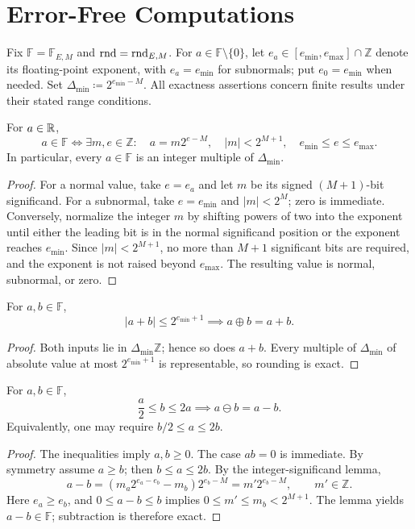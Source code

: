 \section{Error-Free Computations}

Fix $\mathbb F=\mathbb F_{E, M}$ and $\operatorname{rnd}=\operatorname{rnd}_{E, M}$.
For $a\in\mathbb F\setminus\{0\}$, let
$e_a\in[e_{\min}, e_{\max}]\cap\mathbb Z$ denote its
floating-point exponent, with $e_a=e_{\min}$ for subnormals;
put $e_0=e_{\min}$ when needed. Set
$\Delta_{\min}\coloneqq2^{e_{\min}-M}$.
All exactness assertions concern finite results under their
stated range conditions.

\begin{lemma}
For $a\in\mathbb{R}$,
\[
 a\in\mathbb F\iff
 \exists m, e\in\mathbb Z:\quad
 a=m2^{e-M}, \quad |m|<2^{M+1}, \quad
 e_{\min}\le e\le e_{\max}.
\]
In particular, every $a\in\mathbb F$ is an integer multiple
of $\Delta_{\min}$.
\end{lemma}
\begin{proof}
For a normal value, take $e=e_a$ and let $m$ be its signed
$(M+1)$-bit significand. For a subnormal, take $e=e_{\min}$
and $|m|<2^M$; zero is immediate.
Conversely, normalize the integer $m$ by shifting powers of
two into the exponent until either the leading bit is in the
normal significand position or the exponent reaches $e_{\min}$.
Since $|m|<2^{M+1}$, no more than $M+1$ significant bits
are required, and the exponent is not raised beyond
$e_{\max}$. The resulting value is normal, subnormal, or zero.
\end{proof}

\begin{theorem}
For $a, b\in\mathbb F$,
\[
 |a+b|\le2^{e_{\min}+1}\implies a\oplus b=a+b.
\]
\end{theorem}
\begin{proof}
Both inputs lie in $\Delta_{\min}\mathbb Z$; hence so does
$a+b$. Every multiple of $\Delta_{\min}$ of absolute value
at most $2^{e_{\min}+1}$ is representable, so rounding
is exact.
\end{proof}

\begin{theorem}
For $a, b\in\mathbb F$,
\[
 \frac a2\le b\le2a\implies a\ominus b=a-b.
\]
Equivalently, one may require $b/2\le a\le2b$.
\end{theorem}
\begin{proof}
The inequalities imply $a, b\ge0$. The case $ab=0$ is
immediate. By symmetry assume $a\ge b$; then $b\le a\le2b$.
By the integer-significand lemma,
\[
 a-b=(m_a2^{e_a-e_b}-m_b)2^{e_b-M}
     =m'2^{e_b-M}, \qquad m'\in\mathbb Z.
\]
Here $e_a\ge e_b$, and $0\le a-b\le b$ implies
$0\le m'\le m_b<2^{M+1}$. The lemma yields
$a-b\in\mathbb F$; subtraction is therefore exact.
\end{proof}

